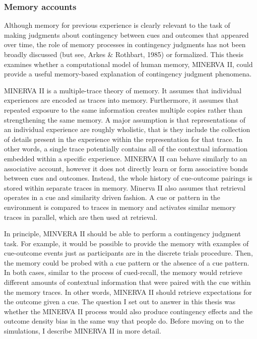 \documentclass[
  english,
  man,floatsintext]{apa6}
\begin{document}
\hypertarget{memory-accounts}{%
\subsubsection{Memory accounts}\label{memory-accounts}}

Although memory for previous experience is clearly relevant to the task of making judgments about contingency between cues and outcomes that appeared over time, the role of memory processes in contingency judgments has not been broadly discussed (but see, Arkes \& Rothbart, 1985) or formalized. This thesis examines whether a computational model of human memory, MINERVA II, could provide a useful memory-based explanation of contingency judgment phenomena.

MINERVA II is a multiple-trace theory of memory. It assumes that individual experiences are encoded as traces into memory. Furthermore, it assumes that repeated exposure to the same information creates multiple copies rather than strengthening the same memory. A major assumption is that representations of an individual experience are roughly wholistic, that is they include the collection of details present in the experience within the representation for that trace. In other words, a single trace potentially contains all of the contextual information embedded within a specific experience. MINERVA II can behave similarly to an associative account, however it does not directly learn or form associative bonds between cues and outcomes. Instead, the whole history of cue-outcome pairings is stored within separate traces in memory. Minerva II also assumes that retrieval operates in a cue and similarity driven fashion. A cue or pattern in the environment is compared to traces in memory and activates similar memory traces in parallel, which are then used at retrieval.

In principle, MINVERA II should be able to perform a contingency judgment task. For example, it would be possible to provide the memory with examples of cue-outcome events just as participants are in the discrete trials procedure. Then, the memory could be probed with a cue pattern or the absence of a cue pattern. In both cases, similar to the process of cued-recall, the memory would retrieve different amounts of contextual information that were paired with the cue within the memory traces. In other words, MINERVA II should retrieve expectations for the outcome given a cue. The question I set out to answer in this thesis was whether the MINERVA II process would also produce contingency effects and the outcome density bias in the same way that people do. Before moving on to the simulations, I describe MINERVA II in more detail.
\end{document}
